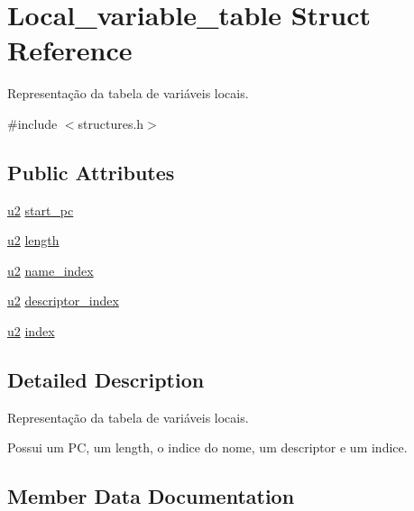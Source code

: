 \hypertarget{structLocal__variable__table}{}\section{Local\+\_\+variable\+\_\+table Struct Reference}
\label{structLocal__variable__table}


Representação da tabela de variáveis locais.  




{\ttfamily \#include $<$structures.\+h$>$}

\subsection*{Public Attributes}
\begin{DoxyCompactItemize}
\item 
\hyperlink{structures_8h_a55ef8d87fd202b8417704c089899c5b9}{u2} \hyperlink{structLocal__variable__table_a857ab3f5a0d3a22f1eb7eccdd9c034e1}{start\+\_\+pc}
\item 
\hyperlink{structures_8h_a55ef8d87fd202b8417704c089899c5b9}{u2} \hyperlink{structLocal__variable__table_aa7ed2c337f001f6922abef82a7a2877b}{length}
\item 
\hyperlink{structures_8h_a55ef8d87fd202b8417704c089899c5b9}{u2} \hyperlink{structLocal__variable__table_ae14ab32d3cf126ede896ea6b1a7053a2}{name\+\_\+index}
\item 
\hyperlink{structures_8h_a55ef8d87fd202b8417704c089899c5b9}{u2} \hyperlink{structLocal__variable__table_ac30f0857c677e82b9665b709369adb5c}{descriptor\+\_\+index}
\item 
\hyperlink{structures_8h_a55ef8d87fd202b8417704c089899c5b9}{u2} \hyperlink{structLocal__variable__table_aa9c60b3758f3edc8c4761af238e576a9}{index}
\end{DoxyCompactItemize}


\subsection{Detailed Description}
Representação da tabela de variáveis locais. 

Possui um PC, um length, o indice do nome, um descriptor e um indice. 

\subsection{Member Data Documentation}

